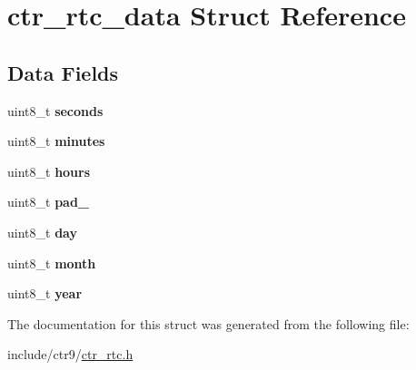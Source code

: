 \hypertarget{structctr__rtc__data}{}\section{ctr\+\_\+rtc\+\_\+data Struct Reference}
\label{structctr__rtc__data}
\subsection*{Data Fields}
\begin{DoxyCompactItemize}
\item 
uint8\+\_\+t {\bfseries seconds}\hypertarget{structctr__rtc__data_a18478d33e95ab466243358a6e2cbe7d9}{}\label{structctr__rtc__data_a18478d33e95ab466243358a6e2cbe7d9}

\item 
uint8\+\_\+t {\bfseries minutes}\hypertarget{structctr__rtc__data_a198d63f40ed41af1144176c62e98fe56}{}\label{structctr__rtc__data_a198d63f40ed41af1144176c62e98fe56}

\item 
uint8\+\_\+t {\bfseries hours}\hypertarget{structctr__rtc__data_afca68e3de10a0b4bcb8fa069398c7eb8}{}\label{structctr__rtc__data_afca68e3de10a0b4bcb8fa069398c7eb8}

\item 
uint8\+\_\+t {\bfseries pad\+\_\+}\hypertarget{structctr__rtc__data_a4dca182b7eab824a04e07204e6f96818}{}\label{structctr__rtc__data_a4dca182b7eab824a04e07204e6f96818}

\item 
uint8\+\_\+t {\bfseries day}\hypertarget{structctr__rtc__data_a94f1e2bff8d5b2ad27acddcc7aa6e826}{}\label{structctr__rtc__data_a94f1e2bff8d5b2ad27acddcc7aa6e826}

\item 
uint8\+\_\+t {\bfseries month}\hypertarget{structctr__rtc__data_a0574fde32f10574c66fb755aee3bef8b}{}\label{structctr__rtc__data_a0574fde32f10574c66fb755aee3bef8b}

\item 
uint8\+\_\+t {\bfseries year}\hypertarget{structctr__rtc__data_a91eb3c1521145b47da6c3353e0a886e5}{}\label{structctr__rtc__data_a91eb3c1521145b47da6c3353e0a886e5}

\end{DoxyCompactItemize}


The documentation for this struct was generated from the following file\+:\begin{DoxyCompactItemize}
\item 
include/ctr9/\hyperlink{ctr__rtc_8h}{ctr\+\_\+rtc.\+h}\end{DoxyCompactItemize}
